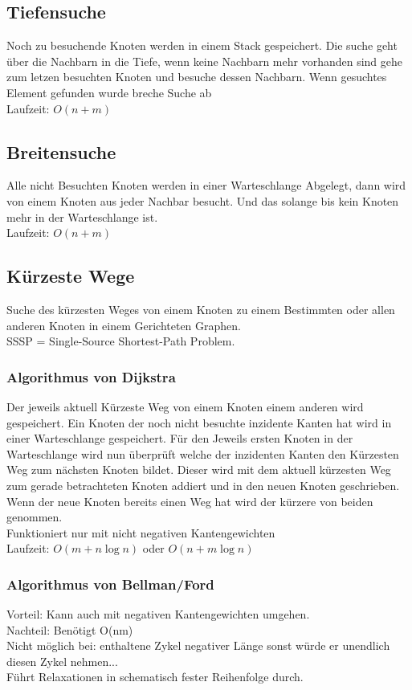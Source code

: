 \documentclass[a4paper]{scrartcl}
\begin{document}
\subsection{Tiefensuche}
Noch zu besuchende Knoten werden in einem Stack gespeichert. Die suche geht über die Nachbarn in die Tiefe, wenn keine  Nachbarn mehr vorhanden sind gehe zum letzen besuchten Knoten und besuche dessen Nachbarn. Wenn gesuchtes Element gefunden wurde breche Suche ab\\
Laufzeit: $O(n+m)$

\subsection{Breitensuche}
Alle nicht Besuchten Knoten werden in einer Warteschlange Abgelegt, dann wird von einem Knoten aus jeder Nachbar besucht. Und das solange bis kein Knoten mehr in der Warteschlange ist.\\ 
Laufzeit: $O(n+m)$

\subsection{Kürzeste Wege}
Suche des kürzesten Weges von einem Knoten zu einem Bestimmten oder allen anderen Knoten in einem Gerichteten Graphen. \\
SSSP = Single-Source Shortest-Path Problem.

\subsubsection{Algorithmus von Dijkstra}
Der jeweils aktuell Kürzeste Weg von einem Knoten einem anderen wird gespeichert. Ein Knoten der noch nicht besuchte inzidente Kanten hat wird in einer Warteschlange gespeichert. Für den Jeweils ersten Knoten in der Warteschlange wird nun überprüft welche der inzidenten Kanten den Kürzesten Weg zum nächsten Knoten bildet. Dieser wird mit dem aktuell kürzesten Weg zum gerade betrachteten Knoten addiert und in den neuen Knoten geschrieben. Wenn der neue Knoten bereits einen Weg hat wird der kürzere von beiden genommen. \\
Funktioniert nur mit nicht negativen Kantengewichten\\

Laufzeit: $O(m+ n\log n)$ oder $O(n + m \log n)$\\

\subsubsection{Algorithmus von Bellman/Ford}
Vorteil: Kann auch mit negativen Kantengewichten umgehen.\\
Nachteil: Benötigt O(nm)\\
Nicht möglich bei: enthaltene Zykel negativer Länge sonst würde er unendlich diesen Zykel nehmen...\\
Führt Relaxationen in schematisch fester Reihenfolge durch.\\
\end{document}

